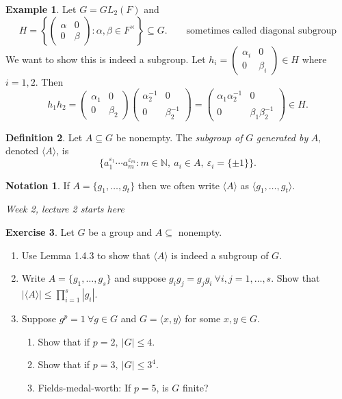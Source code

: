 \documentclass[a4paper]{article}
\theoremstyle{definition}
\newtheorem{defn}{Definition}[subsection]
\newtheorem{example}[defn]{Example}
\newtheorem{exe}[defn]{Exercise}
\newtheorem*{notation}{Notation}
\begin{document}
\begin{example}
Let $G=GL_2(F)$ and
\[
H=\left\{\begin{pmatrix}
  \alpha & 0 \\ 0 & \beta
\end{pmatrix}:\alpha,\beta\in F^{\times}\right\} \subseteq G. \qquad\text{sometimes called diagonal subgroup}
\]
We want to show this is indeed a subgroup. Let $h_i=\begin{pmatrix}
  \alpha_i & 0 \\ 0 & \beta_i
\end{pmatrix}\in H$ where $i=1,2$. Then
\[
h_1h_2=\begin{pmatrix}
  \alpha_1 & 0 \\ 0 & \beta_2
\end{pmatrix}\begin{pmatrix}
  \alpha_2^{-1} & 0 \\ 0 & \beta_2^{-1}
\end{pmatrix}=\begin{pmatrix}
  \alpha_1 \alpha_2^{-1} & 0 \\ 0 & \beta_1\beta_2^{-1}
\end{pmatrix}\in H .
\]
\end{example}
\begin{defn}
Let $A\subseteq G$ be nonempty. The \textit{subgroup of} $G$ \textit{generated by} $A$, denoted $\langle A\rangle$, is
\[
\{a_1^{\varepsilon_1}\cdots a_m^{\varepsilon_m}:m\in\mathbb N,\ a_i\in A,\ \varepsilon_i=\{\pm 1\}\}.
\]
\end{defn}
\begin{notation}
If $A=\{g_1,\ldots,g_t\}$ then we often write $\langle A\rangle$ as $\langle g_1,\ldots,g_t\rangle$.
\end{notation}

\begin{flushright}
\textit{Week 2, lecture 2 starts here}
\end{flushright}

\begin{exe}
Let $G$ be a group and $A\subseteq$ nonempty.
\begin{enumerate}
\item Use Lemma 1.4.3 to show that $\langle A\rangle$ is indeed a subgroup of $G$.
\item Write $A=\{g_1,\ldots,g_s\}$ and suppose $g_ig_j=g_jg_i \ \forall i,j=1,\ldots,s$. Show that $|\langle A\rangle|\leq \prod_{i=1}^s |g_i|$.
\item Suppose $g^p=1 \ \forall g\in G$ and $G=\langle x,y\rangle$ for some $x,y\in G$.
\begin{enumerate}
\item Show that if $p=2,\ |G|\leq 4$.
\item Show that if $p=3,\ |G|\leq 3^4$.
\item Fields-medal-worth: If $p=5$, is $G$ finite?
\end{enumerate}
\end{enumerate}
\end{exe}
\end{document}
